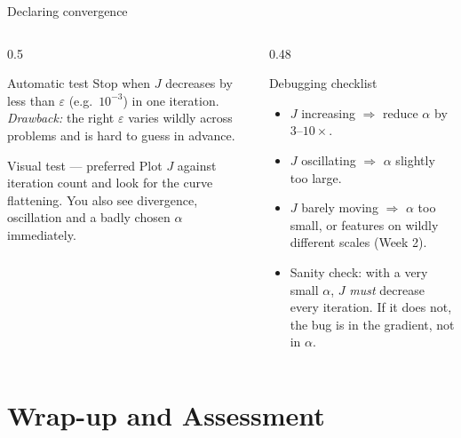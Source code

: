 \documentclass[aspectratio=169,10pt]{beamer}
\begin{document}
\begin{frame}{Declaring convergence}
  \small
  \begin{columns}[T,onlytextwidth]
    \begin{column}{0.5\textwidth}
      \begin{block}{Automatic test}
        Stop when $J$ decreases by less than $\varepsilon$ (e.g.\ $10^{-3}$) in one
        iteration.\\[3pt]
        \emph{Drawback:} the right $\varepsilon$ varies wildly across problems and
        is hard to guess in advance.
      \end{block}
      \begin{block}{Visual test --- preferred}
        Plot $J$ against iteration count and look for the curve flattening.
        You also see divergence, oscillation and a badly chosen $\alpha$
        immediately.
      \end{block}
    \end{column}
    \begin{column}{0.48\textwidth}
      \begin{block}{Debugging checklist}
        \begin{itemize}
          \item $J$ increasing $\Rightarrow$ reduce $\alpha$ by $3$--$10\times$.
          \item $J$ oscillating $\Rightarrow$ $\alpha$ slightly too large.
          \item $J$ barely moving $\Rightarrow$ $\alpha$ too small, or features on
                wildly different scales (Week 2).
          \item Sanity check: with a very small $\alpha$, $J$ \emph{must} decrease
                every iteration. If it does not, the bug is in the gradient, not
                in $\alpha$.
        \end{itemize}
      \end{block}
    \end{column}
  \end{columns}
\end{frame}

\section{Wrap-up and Assessment}
\end{document}

